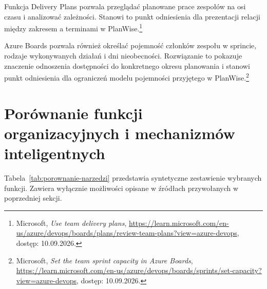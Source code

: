 Funkcja Delivery Plans pozwala przeglądać planowane prace zespołów na osi czasu i analizować zależności. Stanowi to punkt odniesienia dla prezentacji relacji między zakresem a terminami w PlanWise.\footnote{Microsoft, \textit{Use team delivery plans}, \url{https://learn.microsoft.com/en-us/azure/devops/boards/plans/review-team-plans?view=azure-devops}, dostęp: 10.09.2026.}

Azure Boards pozwala również określać pojemność członków zespołu w sprincie, rodzaje wykonywanych działań i dni nieobecności. Rozwiązanie to pokazuje znaczenie odnoszenia dostępności do konkretnego okresu planowania i stanowi punkt odniesienia dla ograniczeń modelu pojemności przyjętego w PlanWise.\footnote{Microsoft, \textit{Set the team sprint capacity in Azure Boards}, \url{https://learn.microsoft.com/en-us/azure/devops/boards/sprints/set-capacity?view=azure-devops}, dostęp: 10.09.2026.}


\section{Porównanie funkcji organizacyjnych i mechanizmów inteligentnych}
\label{sec:porownanie-funkcji}

Tabela~\ref{tab:porownanie-narzedzi} przedstawia syntetyczne zestawienie wybranych funkcji. Zawiera wyłącznie możliwości opisane w źródłach przywołanych w poprzedniej sekcji.

